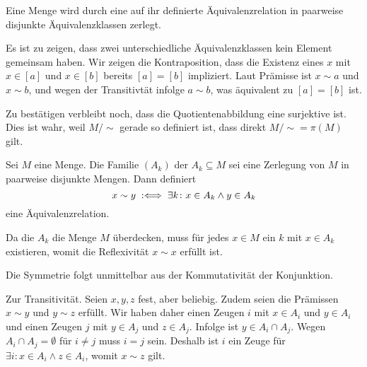 \begin{Satz}\newlinefirst
Eine Menge wird durch eine auf ihr definierte Äquivalenzrelation
in paarweise disjunkte Äquivalenzklassen zerlegt.
\end{Satz}
\begin{Beweis}
Es ist zu zeigen, dass zwei unterschiedliche Äquivalenzklassen 
kein Element gemeinsam haben. Wir zeigen die Kontraposition, dass die
Existenz eines $x$ mit $x\in [a]$ und $x\in [b]$ bereits $[a]=[b]$ impliziert.
Laut Prämisse ist $x\sim a$ und $x\sim b$, und wegen der Transitivtät
infolge $a\sim b$, was äquivalent zu $[a]=[b]$ ist.

Zu bestätigen verbleibt noch, dass die Quotientenabbildung eine
surjektive ist. Dies ist wahr, weil $M/{\sim}$ gerade so definiert ist, 
dass direkt $M/{\sim}=\pi(M)$ gilt.\,\qedsymbol
\end{Beweis}

\begin{Satz}%
\label{eq-relation-from-partition}\newlinefirst
Sei $M$ eine Menge. Die Familie $(A_k)$ der $A_k\subseteq M$ sei
eine Zerlegung von $M$ in paarweise disjunkte Mengen. Dann definiert
\[x\sim y\;:\Longleftrightarrow\; \exists k\colon x\in A_k\land y\in A_k\]
eine Äquivalenzrelation.
\end{Satz}
\begin{Beweis}
Da die $A_k$ die Menge $M$ überdecken, muss für jedes $x\in M$
ein $k$ mit $x\in A_k$ existieren, womit die Reflexivität
$x\sim x$ erfüllt ist.

Die Symmetrie folgt unmittelbar aus der Kommutativität der Konjunktion.

Zur Transitivität. Seien $x,y,z$ fest, aber beliebig. Zudem seien die
Prämissen $x\sim y$ und $y\sim z$ erfüllt. Wir haben daher einen Zeugen
$i$ mit $x\in A_i$ und $y\in A_i$ und einen Zeugen $j$ mit $y\in A_j$
und $z\in A_j$. Infolge ist $y\in A_i\cap A_j$. Wegen
$A_i\cap A_j=\emptyset$ für $i\ne j$ muss $i=j$ sein. Deshalb ist
$i$ ein Zeuge für $\exists i\colon x\in A_i\land z\in A_i$, womit
$x\sim z$ gilt.\,\qedsymbol
\end{Beweis}

